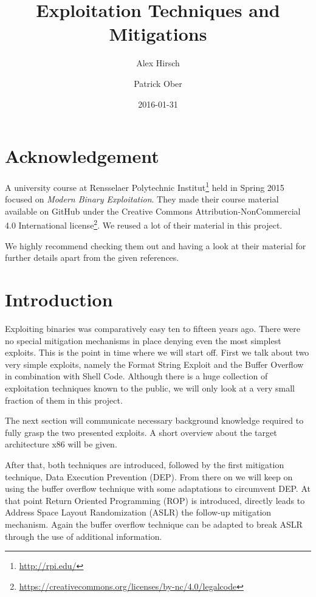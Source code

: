 \documentclass[article]{uibk}
\title{Exploitation Techniques and Mitigations}
\author{Alex Hirsch \and Patrick Ober}
\date{2016-01-31}
\begin{document}
%
%
%

\section*{Acknowledgement}

A university course at Rensselaer Polytechnic
Institut\footnote{\url{http://rpi.edu/}} held in Spring 2015 focused on
\textit{Modern Binary Exploitation}. They made their course material available
on GitHub \cite{rpisec} under the Creative Commons Attribution-NonCommercial
4.0 International
license\footnote{\url{https://creativecommons.org/licenses/by-nc/4.0/legalcode}}.
We reused a lot of their material in this project.

We highly recommend checking them out and having a look at their material for
further details apart from the given references.

\section{Introduction}

Exploiting binaries was comparatively easy ten to fifteen years ago. There were
no special mitigation mechanisms in place denying even the most simplest
exploits. This is the point in time where we will start off. First we talk
about two very simple exploits, namely the Format String Exploit and the Buffer
Overflow in combination with Shell Code. Although there is a huge collection of
exploitation techniques known to the public, we will only look at a very small
fraction of them in this project.

The next section will communicate necessary background knowledge required to
fully grasp the two presented exploits. A short overview about the target
architecture x86 will be given.

After that, both techniques are introduced, followed by the first mitigation
technique, Data Execution Prevention (DEP). From there on we will keep on using
the buffer overflow technique with some adaptations to circumvent DEP. At that
point Return Oriented Programming (ROP) is introduced, directly leads to
Address Space Layout Randomization (ASLR) the follow-up mitigation mechanism.
Again the buffer overflow technique can be adapted to break ASLR through the
use of additional information.
\end{document}
